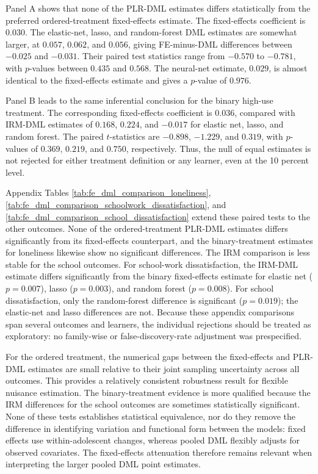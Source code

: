 \documentclass[11pt,oneside,a4paper]{book}
\begin{document}


Panel A shows that none of the PLR-DML estimates differs statistically from the preferred ordered-treatment fixed-effects estimate. The fixed-effects coefficient is \(0.030\). The elastic-net, lasso, and random-forest DML estimates are somewhat larger, at \(0.057\), \(0.062\), and \(0.056\), giving FE-minus-DML differences between \(-0.025\) and \(-0.031\). Their paired test statistics range from \(-0.570\) to \(-0.781\), with \(p\)-values between \(0.435\) and \(0.568\). The neural-net estimate, \(0.029\), is almost identical to the fixed-effects estimate and gives a \(p\)-value of \(0.976\).

Panel B leads to the same inferential conclusion for the binary high-use treatment. The corresponding fixed-effects coefficient is \(0.036\), compared with IRM-DML estimates of \(0.168\), \(0.224\), and \(-0.017\) for elastic net, lasso, and random forest. The paired \(t\)-statistics are \(-0.898\), \(-1.229\), and \(0.319\), with \(p\)-values of \(0.369\), \(0.219\), and \(0.750\), respectively. Thus, the null of equal estimates is not rejected for either treatment definition or any learner, even at the 10 percent level.

Appendix Tables \ref{tab:fe_dml_comparison_loneliness}, \ref{tab:fe_dml_comparison_schoolwork_dissatisfaction}, and \ref{tab:fe_dml_comparison_school_dissatisfaction} extend these paired tests to the other outcomes. None of the ordered-treatment PLR-DML estimates differs significantly from its fixed-effects counterpart, and the binary-treatment estimates for loneliness likewise show no significant differences. The IRM comparison is less stable for the school outcomes. For school-work dissatisfaction, the IRM-DML estimate differs significantly from the binary fixed-effects estimate for elastic net (\(p=0.007\)), lasso (\(p=0.003\)), and random forest (\(p=0.008\)). For school dissatisfaction, only the random-forest difference is significant (\(p=0.019\)); the elastic-net and lasso differences are not. Because these appendix comparisons span several outcomes and learners, the individual rejections should be treated as exploratory: no family-wise or false-discovery-rate adjustment was prespecified.

For the ordered treatment, the numerical gaps between the fixed-effects and PLR-DML estimates are small relative to their joint sampling uncertainty across all outcomes. This provides a relatively consistent robustness result for flexible nuisance estimation. The binary-treatment evidence is more qualified because the IRM differences for the school outcomes are sometimes statistically significant. None of these tests establishes statistical equivalence, nor do they remove the difference in identifying variation and functional form between the models: fixed effects use within-adolescent changes, whereas pooled DML flexibly adjusts for observed covariates. The fixed-effects attenuation therefore remains relevant when interpreting the larger pooled DML point estimates.
\end{document}
